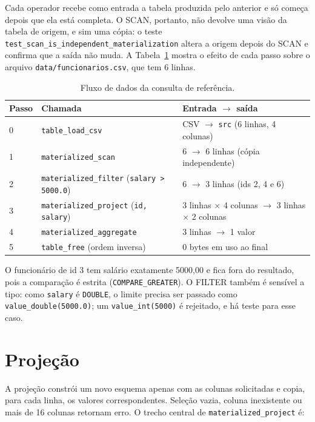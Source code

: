 \documentclass[11pt,a4paper]{article}
\begin{document}
Cada operador recebe como entrada a tabela produzida pelo anterior e só começa depois que ela está completa. O SCAN, portanto, não devolve uma visão da tabela de origem, e sim uma cópia: o teste \texttt{test\_scan\_is\_independent\_materialization} altera a origem depois do SCAN e confirma que a saída não muda. A Tabela~\ref{tab:fluxo} mostra o efeito de cada passo sobre o arquivo \texttt{data/funcionarios.csv}, que tem 6 linhas.

\begin{table}[H]
\centering
\small
\begin{tabular}{@{}lll@{}}
\toprule
Passo & Chamada & Entrada $\rightarrow$ saída \\
\midrule
0 & \texttt{table\_load\_csv} & CSV $\rightarrow$ \texttt{src} (6 linhas, 4 colunas) \\
1 & \texttt{materialized\_scan} & 6 $\rightarrow$ 6 linhas (cópia independente) \\
2 & \texttt{materialized\_filter} (\texttt{salary > 5000.0}) & 6 $\rightarrow$ 3 linhas (ids 2, 4 e 6) \\
3 & \texttt{materialized\_project} (\texttt{id, salary}) & 3 linhas $\times$ 4 colunas $\rightarrow$ 3 linhas $\times$ 2 colunas \\
4 & \texttt{materialized\_aggregate} & 3 linhas $\rightarrow$ 1 valor \\
5 & \texttt{table\_free} (ordem inversa) & 0 bytes em uso ao final \\
\bottomrule
\end{tabular}
\caption{Fluxo de dados da consulta de referência.}
\label{tab:fluxo}
\end{table}

O funcionário de id 3 tem salário exatamente 5000,00 e fica fora do resultado, pois a comparação é estrita (\texttt{COMPARE\_GREATER}). O FILTER também é sensível a tipo: como \texttt{salary} é \texttt{DOUBLE}, o limite precisa ser passado como \texttt{value\_double(5000.0)}; um \texttt{value\_int(5000)} é rejeitado, e há teste para esse caso.

\section{Projeção}
A projeção constrói um novo esquema apenas com as colunas solicitadas e copia, para cada linha, os valores correspondentes. Seleção vazia, coluna inexistente ou mais de 16 colunas retornam erro. O trecho central de \texttt{materialized\_project} é:
\end{document}
